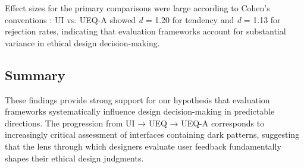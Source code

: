 Effect sizes for the primary comparisons were large according to Cohen's conventions \cite{cohen1988statistical}: UI vs. UEQ-A showed \textit{d} = 1.20 for tendency and \textit{d} = 1.13 for rejection rates, indicating that evaluation frameworks account for substantial variance in ethical design decision-making.

\subsection{Summary}

These findings provide strong support for our hypothesis that evaluation frameworks systematically influence design decision-making in predictable directions. The progression from UI → UEQ → UEQ-A corresponds to increasingly critical assessment of interfaces containing dark patterns, suggesting that the lens through which designers evaluate user feedback fundamentally shapes their ethical design judgments.

